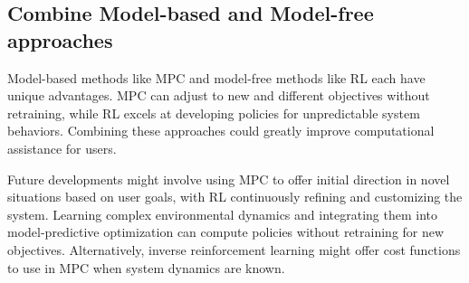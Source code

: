 \subsection{Combine Model-based and Model-free approaches}
Model-based methods like MPC and model-free methods like RL each have unique advantages. MPC can adjust to new and different objectives without retraining, while RL excels at developing policies for unpredictable system behaviors. Combining these approaches could greatly improve computational assistance for users.

Future developments might involve using MPC to offer initial direction in novel situations based on user goals, with RL continuously refining and customizing the system. Learning complex environmental dynamics and integrating them into model-predictive optimization can compute policies without retraining for new objectives. Alternatively, inverse reinforcement learning might offer cost functions to use in MPC when system dynamics are known.


